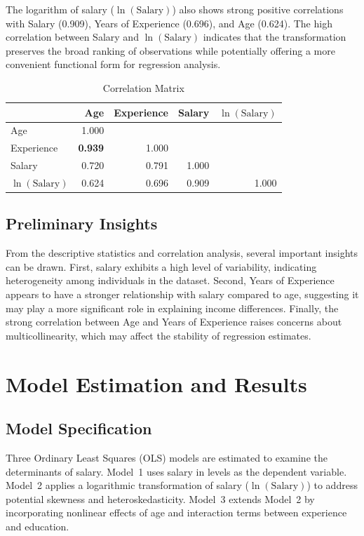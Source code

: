 \documentclass[12pt, a4paper]{article}
\begin{document}
The logarithm of salary (\(\ln(\text{Salary})\)) also shows strong positive correlations with Salary (0.909), Years of Experience (0.696), and Age (0.624). The high correlation between Salary and \(\ln(\text{Salary})\) indicates that the transformation preserves the broad ranking of observations while potentially offering a more convenient functional form for regression analysis.

\begin{table}[htpb]
\centering
\caption{Correlation Matrix}
\label{tab:corr}
\begin{tabular}{lrrrr}
\toprule
& \textbf{Age} & \textbf{Experience} & \textbf{Salary} & \textbf{\(\ln(\text{Salary})\)} \\
\midrule
Age & 1.000 & & & \\
Experience & \textbf{0.939} & 1.000 & & \\
Salary & 0.720 & 0.791 & 1.000 & \\
\(\ln(\text{Salary})\) & 0.624 & 0.696 & 0.909 & 1.000 \\
\bottomrule
\end{tabular}
\end{table}

\subsection{Preliminary Insights}
From the descriptive statistics and correlation analysis, several important insights can be drawn.
First, salary exhibits a high level of variability, indicating heterogeneity among individuals in the dataset. Second, Years of Experience appears to have a stronger relationship with salary compared to age, suggesting it may play a more significant role in explaining income differences. Finally, the strong correlation between Age and Years of Experience raises concerns about multicollinearity, which may affect the stability of regression estimates.

\section{Model Estimation and Results}

\subsection{Model Specification}
Three Ordinary Least Squares (OLS) models are estimated to examine the determinants of salary.
Model~1 uses salary in levels as the dependent variable.
Model~2 applies a logarithmic transformation of salary (\(\ln(\text{Salary})\)) to address potential skewness and heteroskedasticity.
Model~3 extends Model~2 by incorporating nonlinear effects of age and interaction terms between experience and education.
\end{document}
